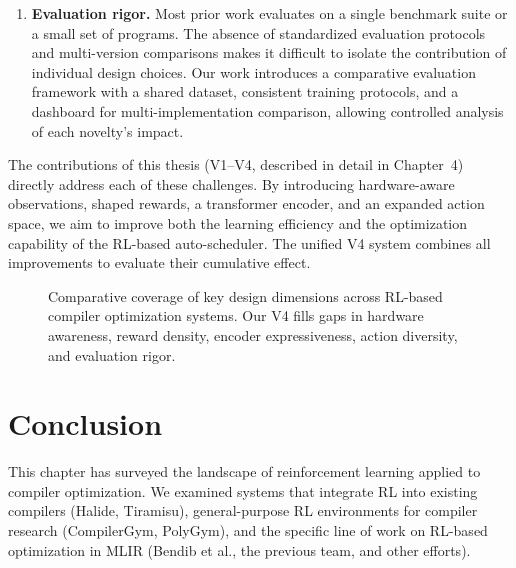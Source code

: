 \begin{enumerate}
    \item \textbf{Evaluation rigor.} Most prior work evaluates on a single benchmark suite or a small set of programs. The absence of standardized evaluation protocols and multi-version comparisons makes it difficult to isolate the contribution of individual design choices. Our work introduces a comparative evaluation framework with a shared dataset, consistent training protocols, and a dashboard for multi-implementation comparison, allowing controlled analysis of each novelty's impact.
\end{enumerate}

The contributions of this thesis (V1–V4, described in detail in Chapter~4) directly address each of these challenges. By introducing hardware-aware observations, shaped rewards, a transformer encoder, and an expanded action space, we aim to improve both the learning efficiency and the optimization capability of the RL-based auto-scheduler. The unified V4 system combines all improvements to evaluate their cumulative effect.

\begin{figure}[H]
    \centering
    \caption{Comparative coverage of key design dimensions across RL-based compiler optimization systems. Our V4 fills gaps in hardware awareness, reward density, encoder expressiveness, action diversity, and evaluation rigor.}
    \label{fig:gap-analysis}
\end{figure}

\section{Conclusion}

This chapter has surveyed the landscape of reinforcement learning applied to compiler optimization. We examined systems that integrate RL into existing compilers (Halide, Tiramisu), general-purpose RL environments for compiler research (CompilerGym, PolyGym), and the specific line of work on RL-based optimization in MLIR (Bendib et al., the previous team, and other efforts).

